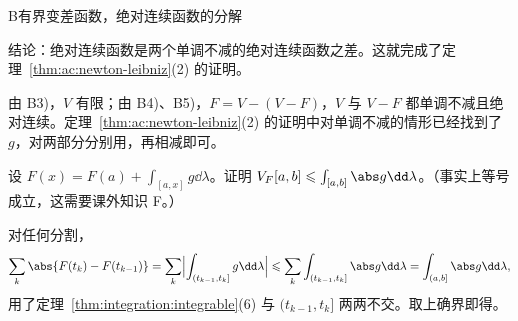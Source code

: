 \begin{probleme}{B}{有界变差函数，绝对连续函数的分解}
\begin{questions}
\begin{solution}
\end{solution}
\item 结论：绝对连续函数是两个单调不减的绝对连续函数之差。这就完成了定理~\ref{thm:ac:newton-leibniz}(2) 的证明。
\begin{solution}
由 B3)，$V$ 有限；由 B4)、B5)，$F=V-(V-F)$，$V$ 与 $V-F$ 都单调不减且绝对连续。定理~\ref{thm:ac:newton-leibniz}(2) 的证明中对单调不减的情形已经找到了 $g$，对两部分分别用，再相减即可。
\end{solution}
\item 设 $F(x)=F(a)+\int_{[a,x]}g\dd\lambda$。证明 $V_F[a,b]\leqslant\int_{[a,b]}\abs g\dd\lambda$。（事实上等号成立，这需要课外知识 F。）
\begin{solution}
对任何分割，
\[
\sum_k\abs{F(t_k)-F(t_{k-1})}=\sum_k\Bigl|\int_{(t_{k-1},t_k]}g\dd\lambda\Bigr|\leqslant\sum_k\int_{(t_{k-1},t_k]}\abs g\dd\lambda=\int_{(a,b]}\abs g\dd\lambda,
\]
用了定理~\ref{thm:integration:integrable}(6) 与 $(t_{k-1},t_k]$ 两两不交。取上确界即得。
\end{solution}
\end{questions}
\end{probleme}

